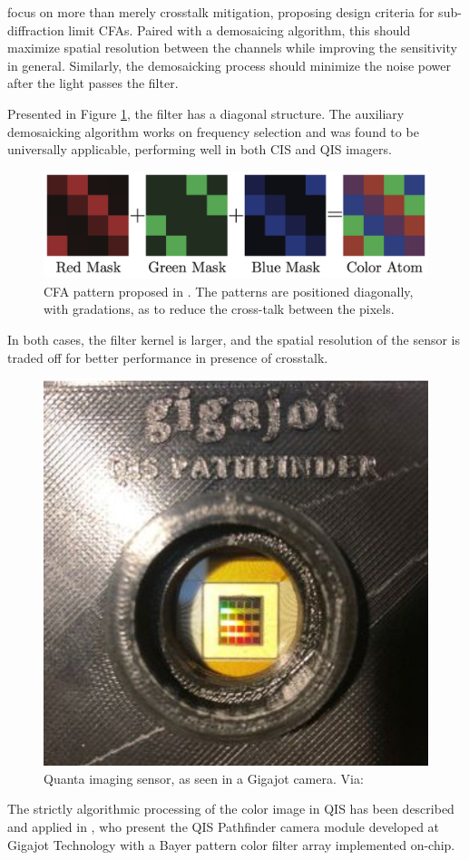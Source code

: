 \cite{elgendy2019color} focus on more than merely crosstalk mitigation, proposing design criteria for sub-diffraction limit CFAs.
Paired with a demosaicing algorithm, this should maximize spatial resolution between the channels while improving the sensitivity in general. Similarly, the demosaicking process should minimize the noise power after the light passes the filter. 

Presented in Figure \ref{fig:cfaelgendy}, the filter has a diagonal structure. The auxiliary demosaicking algorithm works on frequency selection and was found to be universally applicable, performing well in both CIS and QIS imagers.

\begin{figure}[h]
  \centering
  \includegraphics[width=0.7\linewidth]{imgs/cfa/cfaelgendy.png}
  \caption{CFA pattern proposed in \cite{elgendy2019color}. The patterns are positioned diagonally, with gradations, as to reduce the cross-talk between the pixels.}
  \label{fig:cfaelgendy}
\end{figure}

In both cases, the filter kernel is larger, and the spatial resolution of the sensor is traded off for better performance in presence of crosstalk. 


 \begin{figure}[h]
  \centering
  \includegraphics[width=0.5\linewidth]{imgs/qis/gigajot.png}
  \caption{Quanta imaging sensor, as seen in a Gigajot camera. Via: \cite{Gnanasambandam_2019}}
\end{figure}

The strictly algorithmic processing of the color image in QIS has been described and applied in \cite{Gnanasambandam_2019}, who present the QIS Pathfinder camera module developed at Gigajot Technology with a Bayer pattern color filter array implemented on-chip. 